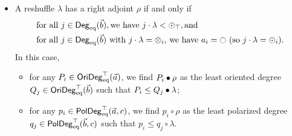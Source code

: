 \documentclass[a4paper]{memoir}
\begin{document}
\begin{theorem}
\begin{enumerate}
\begin{itemize}
			\item A reshuffle $\lambda$ has a right adjoint $\rho$ if and only if
			\begin{align}
				&\text{for all } j \in \Degeq(\vec b), \text{we have } j \cdot \lambda < \nonpol_\top, \text{and} \label{eq:poresh-right-adjoint-crit1} \\
				&\text{for all } j \in \Degeq(\vec b) \text{ with } j \cdot \lambda = \mixpol_i \text{, we have } a_i = \npolar \text{ (so $j \cdot \lambda = \nonpol_i$)}. \label{eq:poresh-right-adjoint-crit2}
			\end{align}
			In this case,
			\begin{itemize}
				\item for any $P_i \in \mathsf{OriDeg}_{\mathrm{eq}}^\top(\vec a)$, we find $P_i \mathbin{\bullet} \rho$ as the least oriented degree $Q_j \in \mathsf{OriDeg}_{\mathrm{eq}}^\top(\vec b)$ such that $P_i \leq Q_j \mathbin{\bullet} \lambda$;
				\item for any $p_i \in \mathsf{PolDeg}_{\mathrm{eq}}^\top(\vec a, c)$, we find $p_i \circ \rho$ as the least polarized degree $q_j \in \mathsf{PolDeg}_{\mathrm{eq}}^\top(\vec b, c)$ such that $p_i \leq q_j \circ \lambda$.
			\end{itemize}
		\end{itemize}
	\end{enumerate}
\end{theorem}
\end{document}
